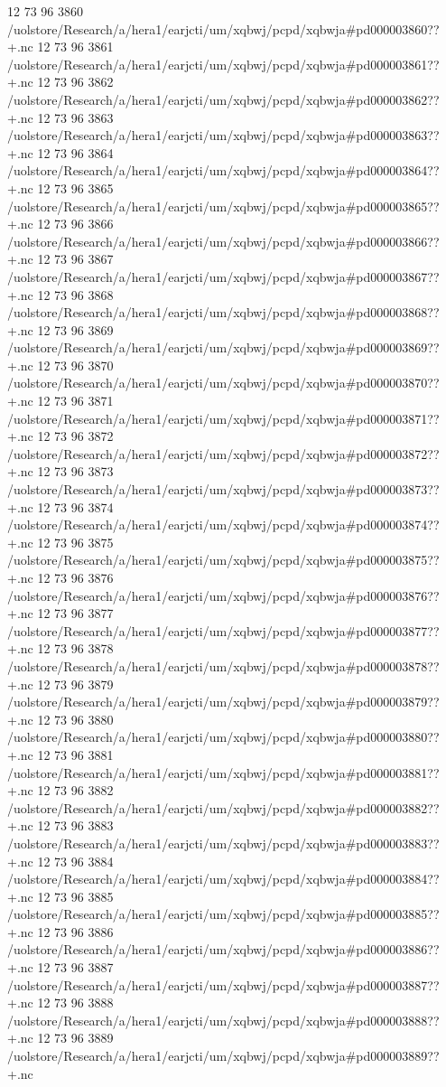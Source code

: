 12 73 96
3860
/uolstore/Research/a/hera1/earjcti/um/xqbwj/pcpd/xqbwja#pd000003860??+.nc
12 73 96
3861
/uolstore/Research/a/hera1/earjcti/um/xqbwj/pcpd/xqbwja#pd000003861??+.nc
12 73 96
3862
/uolstore/Research/a/hera1/earjcti/um/xqbwj/pcpd/xqbwja#pd000003862??+.nc
12 73 96
3863
/uolstore/Research/a/hera1/earjcti/um/xqbwj/pcpd/xqbwja#pd000003863??+.nc
12 73 96
3864
/uolstore/Research/a/hera1/earjcti/um/xqbwj/pcpd/xqbwja#pd000003864??+.nc
12 73 96
3865
/uolstore/Research/a/hera1/earjcti/um/xqbwj/pcpd/xqbwja#pd000003865??+.nc
12 73 96
3866
/uolstore/Research/a/hera1/earjcti/um/xqbwj/pcpd/xqbwja#pd000003866??+.nc
12 73 96
3867
/uolstore/Research/a/hera1/earjcti/um/xqbwj/pcpd/xqbwja#pd000003867??+.nc
12 73 96
3868
/uolstore/Research/a/hera1/earjcti/um/xqbwj/pcpd/xqbwja#pd000003868??+.nc
12 73 96
3869
/uolstore/Research/a/hera1/earjcti/um/xqbwj/pcpd/xqbwja#pd000003869??+.nc
12 73 96
3870
/uolstore/Research/a/hera1/earjcti/um/xqbwj/pcpd/xqbwja#pd000003870??+.nc
12 73 96
3871
/uolstore/Research/a/hera1/earjcti/um/xqbwj/pcpd/xqbwja#pd000003871??+.nc
12 73 96
3872
/uolstore/Research/a/hera1/earjcti/um/xqbwj/pcpd/xqbwja#pd000003872??+.nc
12 73 96
3873
/uolstore/Research/a/hera1/earjcti/um/xqbwj/pcpd/xqbwja#pd000003873??+.nc
12 73 96
3874
/uolstore/Research/a/hera1/earjcti/um/xqbwj/pcpd/xqbwja#pd000003874??+.nc
12 73 96
3875
/uolstore/Research/a/hera1/earjcti/um/xqbwj/pcpd/xqbwja#pd000003875??+.nc
12 73 96
3876
/uolstore/Research/a/hera1/earjcti/um/xqbwj/pcpd/xqbwja#pd000003876??+.nc
12 73 96
3877
/uolstore/Research/a/hera1/earjcti/um/xqbwj/pcpd/xqbwja#pd000003877??+.nc
12 73 96
3878
/uolstore/Research/a/hera1/earjcti/um/xqbwj/pcpd/xqbwja#pd000003878??+.nc
12 73 96
3879
/uolstore/Research/a/hera1/earjcti/um/xqbwj/pcpd/xqbwja#pd000003879??+.nc
12 73 96
3880
/uolstore/Research/a/hera1/earjcti/um/xqbwj/pcpd/xqbwja#pd000003880??+.nc
12 73 96
3881
/uolstore/Research/a/hera1/earjcti/um/xqbwj/pcpd/xqbwja#pd000003881??+.nc
12 73 96
3882
/uolstore/Research/a/hera1/earjcti/um/xqbwj/pcpd/xqbwja#pd000003882??+.nc
12 73 96
3883
/uolstore/Research/a/hera1/earjcti/um/xqbwj/pcpd/xqbwja#pd000003883??+.nc
12 73 96
3884
/uolstore/Research/a/hera1/earjcti/um/xqbwj/pcpd/xqbwja#pd000003884??+.nc
12 73 96
3885
/uolstore/Research/a/hera1/earjcti/um/xqbwj/pcpd/xqbwja#pd000003885??+.nc
12 73 96
3886
/uolstore/Research/a/hera1/earjcti/um/xqbwj/pcpd/xqbwja#pd000003886??+.nc
12 73 96
3887
/uolstore/Research/a/hera1/earjcti/um/xqbwj/pcpd/xqbwja#pd000003887??+.nc
12 73 96
3888
/uolstore/Research/a/hera1/earjcti/um/xqbwj/pcpd/xqbwja#pd000003888??+.nc
12 73 96
3889
/uolstore/Research/a/hera1/earjcti/um/xqbwj/pcpd/xqbwja#pd000003889??+.nc
